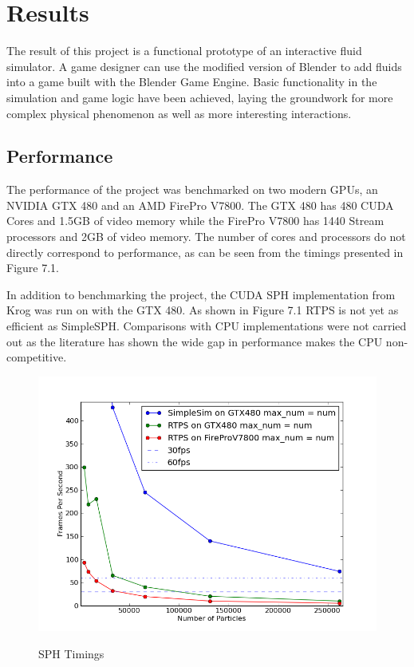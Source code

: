 \chapter{Results}

The result of this project is a functional prototype of an interactive fluid
simulator. A game designer can use the modified version of Blender to add
fluids into a game built with the Blender Game Engine. Basic functionality in
the simulation and game logic have been achieved, laying the groundwork for
more complex physical phenomenon as well as more interesting interactions.


\section{Performance}
    
The performance of the project was benchmarked on two modern GPUs, an NVIDIA
GTX 480 and an AMD FirePro V7800. The GTX 480 has 480 CUDA Cores and 1.5GB of
video memory while the FirePro V7800 has 1440 Stream processors and 2GB of
video memory. The number of cores and processors do not directly correspond to
performance, as can be seen from the timings presented in Figure 7.1.


In addition to benchmarking the project, the CUDA SPH implementation from
Krog\cite{Krog2010} was run on with the GTX 480. As shown in Figure 7.1 RTPS is
not yet as efficient as SimpleSPH. Comparisons with CPU implementations were
not carried out as the literature has shown the wide gap in performance makes
the CPU non-competitive.\cite{Hoetzlein}\cite{Krog2010}


\begin{figure}[!htc]
 		\centering
		\includegraphics[scale=0.5]{figures/maxnum_eq_num_fps.png}
		\label{fig:logic}
        \caption{ SPH Timings }
\end{figure}


